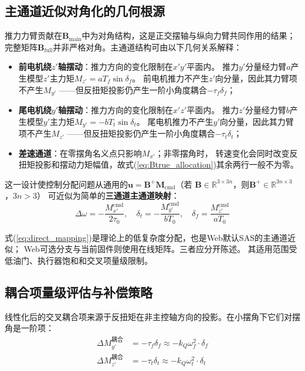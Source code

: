 \subsection{主通道近似对角化的几何根源}

推力力臂贡献在$\bm{B}_{\mathrm{main}}$中为对角结构，这是正交摆轴与纵向力臂共同作用的结果；
完整矩阵$\bm{B}_{\mathrm{full}}$并非严格对角。主通道结构可由以下几何关系解释：

\begin{itemize}
    \item \textbf{前电机绕$z'$轴摆动}：推力方向的变化限制在$x'y'$平面内。
          推力$y'$分量经力臂$a$产生模型$z'$主力矩$M_{z'}=aT_f\sin\delta_f$。
          前电机推力不产生$z'$向分量，因此其力臂项不产生$M_{y'}$
          ——但反扭矩投影仍产生一阶小角度耦合$-\tau_f\delta_f$；
    \item \textbf{尾电机绕$y'$轴摆动}：推力方向的变化限制在$x'z'$平面内。
          推力$z'$分量经力臂$b$产生模型$y'$主力矩$M_{y'}=-bT_t\sin\delta_t$。
          尾电机推力不产生$y'$向分量，因此其力臂项不产生$M_{z'}$
          ——但反扭矩投影仍产生一阶小角度耦合$-\tau_t\delta_t$；
    \item \textbf{差速通道}：在零摆角名义点只影响$M_{x'}$；非零摆角时，
          转速变化会同时改变反扭矩投影和摆动力矩幅值，故式(\ref{eq:Btrue_allocation})其余两行一般不为零。
\end{itemize}

这一设计使控制分配问题从通用的$\bm{u}=\bm{B}^+\bm{M}_{\text{cmd}}$（若
$\bm B\in\mathbb R^{3\times3n}$，则$\bm B^+\in\mathbb R^{3n\times3}$，$3n>3$）
可近似为简单的\textbf{三通道主通道映射}：
\begin{equation}
    \Delta\omega = -\frac{M_{x'}^{\text{cmd}}}{2\tau_0}, \quad
    \delta_t = -\frac{M_{y'}^{\text{cmd}}}{b T_0}, \quad
    \delta_f = \frac{M_{z'}^{\text{cmd}}}{a T_0}
    \label{eq:direct_mapping}
\end{equation}

式(\ref{eq:direct_mapping})是理论上的低复杂度分配，也是Web默认SAS的主通道近似；
Web可选分支与当前固件则使用在线矩阵。三者应分开陈述。
其适用范围受低油门、执行器饱和和交叉项量级限制\cite{johansen2013control,oppenheimer2010control}。

\subsection{耦合项量级评估与补偿策略}

线性化后的交叉耦合项来源于反扭矩在非主控轴方向的投影。在小摆角下它们对摆角是一阶项：
\begin{align}
    \Delta M_{y'}^{\text{耦合}} &= -\tau_f \delta_f
    \approx -k_Q \omega_f^2 \cdot \delta_f
    \label{eq:coupling_pitch} \\
    \Delta M_{z'}^{\text{耦合}} &= -\tau_t \delta_t
    \approx -k_Q \omega_t^2 \cdot \delta_t
    \label{eq:coupling_yaw}
\end{align}

